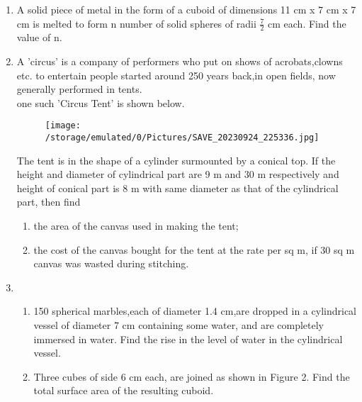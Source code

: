 \documentclass[12pt]{article}
\begin{document}
\begin{enumerate}
    \item A solid piece of metal in the form of a cuboid of dimensions 11 cm x 7 cm x 7 cm is melted to form n number of solid spheres of radii $\frac{7}{2}$ cm each. Find the value of n.
         
      \item  A 'circus' is a company of performers who put on shows of acrobats,clowns etc. to entertain people started around 250 years back,in open fields, now generally performed in tents.  \\
     one such 'Circus Tent' is shown below.
     \begin{figure}[ht]
         \centering
          \texttt{[image: /storage/emulated/0/Pictures/SAVE\_20230924\_225336.jpg]}
         \caption{}
         \label{}
     \end{figure}
         
     
     The tent is in the shape of a cylinder surmounted by a conical top. If the height and diameter of cylindrical part are 9 m and 30 m respectively and height of conical part is 8 m with same diameter as that of the cylindrical part, then find
     \begin{enumerate}
         \item the area of the canvas used in making the tent;
         \item the cost of the canvas bought for the tent at the rate  per sq m, if 30 sq m canvas was wasted during stitching.
     \end{enumerate}

     \item
       \begin{enumerate}
           \item 150 spherical marbles,each of diameter 1.4 cm,are dropped in a cylindrical vessel of diameter 7 cm containing some water, and are completely immersed in water. Find the rise in the level of water in the cylindrical vessel.
           \item Three cubes of side 6 cm each, are joined as shown in Figure 2.
           Find the total surface area of the resulting cuboid.
       \end{enumerate}
       

\end{enumerate}
\end{document}
